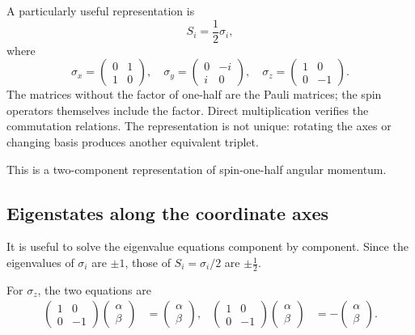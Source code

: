 A particularly useful representation is
\begin{equation}
S_i=\frac12\sigma_i,
\end{equation}
where
\begin{equation}
\sigma_x=
\begin{pmatrix}
0&1\\
1&0
\end{pmatrix},
\quad
\sigma_y=
\begin{pmatrix}
0&-i\\
i&0
\end{pmatrix},
\quad
\sigma_z=
\begin{pmatrix}
1&0\\
0&-1
\end{pmatrix}.
\end{equation}
The matrices without the factor of one-half are the Pauli matrices; the spin operators themselves include the factor. Direct multiplication verifies the commutation relations. The representation is not unique: rotating the axes or changing basis produces another equivalent triplet.

This is a two-component representation of spin-one-half angular momentum.

\subsection{Eigenstates along the coordinate axes}

It is useful to solve the eigenvalue equations component by component. Since the eigenvalues of \(\sigma_i\) are \(\pm1\), those of \(S_i=\sigma_i/2\) are \(\pm\tfrac12\).

For \(\sigma_z\), the two equations are
\begin{align}
\begin{pmatrix}
1&0\\
0&-1
\end{pmatrix}
\begin{pmatrix}
\alpha\\
\beta
\end{pmatrix}
&=
\begin{pmatrix}
\alpha\\
\beta
\end{pmatrix},
&
\begin{pmatrix}
1&0\\
0&-1
\end{pmatrix}
\begin{pmatrix}
\alpha\\
\beta
\end{pmatrix}
&=
-
\begin{pmatrix}
\alpha\\
\beta
\end{pmatrix}.
\end{align}

